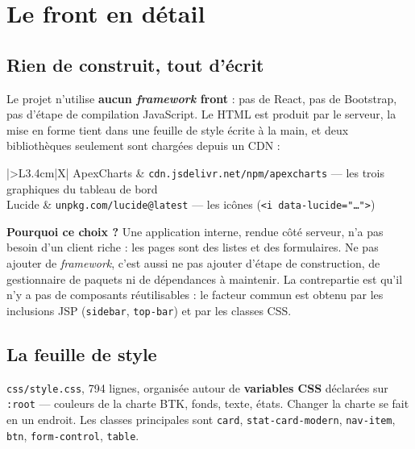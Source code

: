 \section{Le front en détail}

\subsection{Rien de construit, tout d'écrit}

Le projet n'utilise \textbf{aucun \emph{framework} front} : pas de React,
pas de Bootstrap, pas d'étape de compilation JavaScript. Le HTML est produit
par le serveur, la mise en forme tient dans une feuille de style écrite à la
main, et deux bibliothèques seulement sont chargées depuis un CDN :

\noindent\begin{tabularx}{\textwidth}{|>{\bfseries}L{3.4cm}|X|}
\hline
ApexCharts & \texttt{cdn.jsdelivr.net/npm/apexcharts} --- les trois graphiques du tableau de bord\\
\hline
Lucide & \texttt{unpkg.com/lucide@latest} --- les icônes (\texttt{<i data-lucide="\dots">})\\
\hline
\end{tabularx}

\begin{retenir}
\textbf{Pourquoi ce choix ?} Une application interne, rendue côté serveur,
n'a pas besoin d'un client riche : les pages sont des listes et des
formulaires. Ne pas ajouter de \emph{framework}, c'est aussi ne pas ajouter
d'étape de construction, de gestionnaire de paquets ni de dépendances à
maintenir. La contrepartie est qu'il n'y a pas de composants réutilisables :
le facteur commun est obtenu par les inclusions JSP (\texttt{sidebar},
\texttt{top-bar}) et par les classes CSS.
\end{retenir}

\subsection{La feuille de style}

\texttt{css/style.css}, 794 lignes, organisée autour de \textbf{variables CSS}
déclarées sur \texttt{:root} --- couleurs de la charte BTK, fonds, texte,
états. Changer la charte se fait en un endroit. Les classes principales sont
\texttt{card}, \texttt{stat-card-modern}, \texttt{nav-item}, \texttt{btn},
\texttt{form-control}, \texttt{table}.

